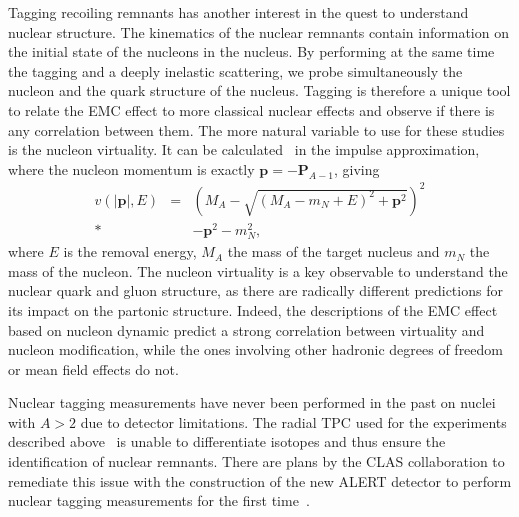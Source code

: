 Tagging recoiling remnants has another interest in the quest to understand nuclear structure.
The kinematics of the nuclear remnants contain information on the
initial state of the nucleons in the nucleus. By performing at the same time the 
tagging and a deeply inelastic scattering, we probe simultaneously the nucleon and the 
quark structure of the nucleus. Tagging is therefore a unique tool to relate the EMC
effect to more classical nuclear effects and observe if there is any correlation between
them. The more natural variable to use for these studies is the nucleon virtuality.
It can be calculated~\cite{CiofidegliAtti:2007ork} in the impulse 
approximation, where the nucleon momentum is exactly $\mathbf{p} = -\mathbf{P}_{A-1}$, 
giving
\begin{eqnarray}
    v(|\mathbf{p}|, E) &  =  & \left (M_A - \sqrt{(M_A - m_N + E)^2 + \mathbf{p}^2} \right )^2  \\* \nonumber
                    & & -  \mathbf{p}^2 - m_N^2,
\end{eqnarray} 
where $E$ is the removal energy, $M_A$ the mass of the target nucleus
and $m_N$ the mass of the nucleon. The nucleon virtuality is a key 
observable to understand the nuclear quark and gluon structure,
as there are radically different predictions for its impact on the partonic structure.
Indeed, the descriptions of the EMC effect based on nucleon dynamic 
predict a strong correlation between virtuality and nucleon modification,
while the ones involving other hadronic degrees of 
freedom or mean field effects do not. 

Nuclear tagging measurements have never been performed in the past
on nuclei with $A>2$ due to detector limitations. The radial TPC used 
for the experiments described above~\cite{Baillie:2011za}
is unable to differentiate isotopes and thus ensure the identification of 
nuclear remnants. There are plans by the CLAS collaboration to remediate this issue
with the construction of the new ALERT detector to perform nuclear tagging measurements 
for the first time~\cite{Armstrong:2017zqr,Armstrong:2017zcm}.


